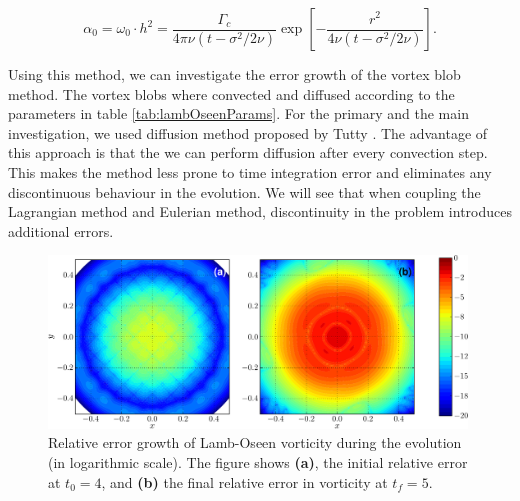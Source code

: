 	\begin{equation}
	\alpha_0 = \omega_0\cdot h^2 = \frac{\Gamma_c}{4\pi\nu\left(t-\sigma^2/2\nu\right)} \exp\left[-\frac{r^2}{4\nu\left(t-\sigma^2/2\nu\right)}\right].
	\end{equation}
	
Using this method, we can investigate the error growth of the vortex blob method. The vortex blobs where convected and diffused according to the parameters in table \ref{tab:lambOseenParams}. For the primary and the main investigation, we used diffusion method proposed by Tutty \cite{2010arXiv1009.0166T}. The advantage of this approach is that the we can perform diffusion after every convection step. This makes the method less prone to time integration error and eliminates any discontinuous behaviour in the evolution. We will see that when coupling the Lagrangian method and Eulerian method, discontinuity in the problem introduces additional errors.

	\begin{figure}[!t]
	\centering
	\includegraphics[width=0.99\textwidth]{figures/lagrangian/lambOseen_convection_vorticityErrorContours_compressed-crop.pdf}
	\caption{Relative error growth of Lamb-Oseen vorticity during the evolution (in logarithmic scale). The figure shows \textbf{(a)}, the initial relative error at $t_0=4$, and \textbf{(b)} the final relative error in vorticity at $t_f=5$.}
	\label{fig:lambOseen_convection_vorticityErrorContours_compressed}
	\end{figure}

